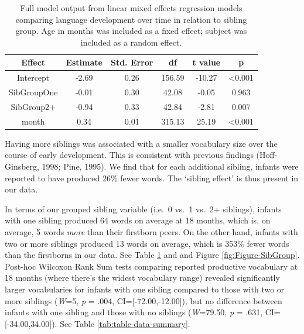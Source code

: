 \documentclass[
  man,mask,floatsintext]{apa6}
\begin{document}
\newpage

\begin{longtable}[t]{cccccc}
\caption{\label{tab:table-sibgroup-model-summary}Full model output from linear mixed effects regression models comparing language development over time in relation to sibling group. Age in months was included as a fixed effect; subject was included as a random effect.}\\
\toprule
Effect & Estimate & Std. Error & df & t value & p\\
\midrule
Intercept & -2.69 & 0.26 & 156.59 & -10.27 & <0.001\\
SibGroupOne & -0.01 & 0.30 & 42.08 & -0.05 & 0.963\\
SibGroup2+ & -0.94 & 0.33 & 42.84 & -2.81 & 0.007\\
month & 0.34 & 0.01 & 315.13 & 25.19 & <0.001\\
\bottomrule
\end{longtable}

Having more siblings was associated with a smaller vocabulary size over the course of early development. This is consistent with previous findings (Hoff-Ginsberg, 1998; Pine, 1995). We find that for each additional sibling, infants were reported to have produced 26\% fewer words. The `sibling effect' is thus present in our data.

In terms of our grouped sibling variable (i.e.~0 vs.~1 vs.~2+ siblings), infants with one sibling produced 64 words on average at 18 months, which is, on average, 5 words \emph{more} than their firstborn peers. On the other hand, infants with two or more siblings produced 13 words on average, which is 353\% fewer words than the firstborns in our data. See Table \ref{tab:table-sibgroup-model-summary} and and Figure \ref{fig:Figure-SibGroup}. Post-hoc Wilcoxon Rank Sum tests comparing reported productive vocabulary at 18 months (where there's the widest vocabulary range) revealed significantly larger vocabularies for infants with one sibling compared to those with two or more siblings (\emph{W}=5, \emph{p} = .004, CI={[}-72.00,-12.00{]}), but no difference between infants with one sibling and those with no siblings (\emph{W}=79.50, \emph{p} = .631, CI={[}-34.00,34.00{]}). See Table \ref{tab:table-data-summary}.
\end{document}
